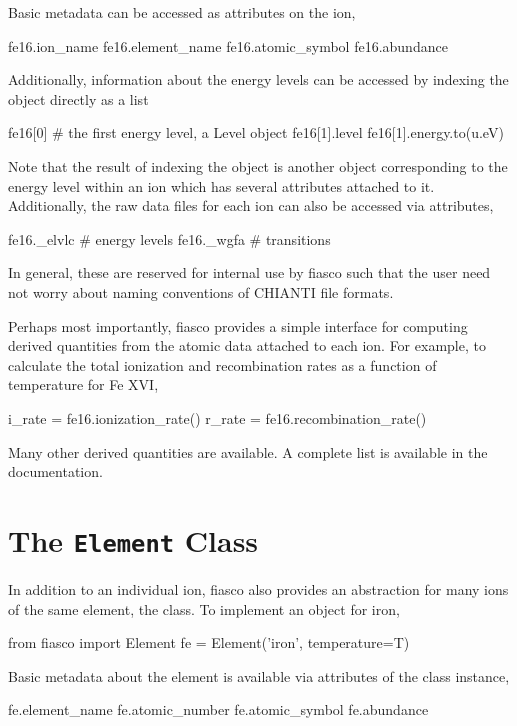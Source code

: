 Basic metadata can be accessed as attributes on the ion,
\begin{pyverbatim}[appendix1][baselinestretch=1,xleftmargin=3em]
fe16.ion_name
fe16.element_name
fe16.atomic_symbol
fe16.abundance
\end{pyverbatim}
Additionally, information about the energy levels can be accessed by indexing the object directly as a list
\begin{pyverbatim}[appendix1][baselinestretch=1,xleftmargin=3em]
fe16[0] # the first energy level, a Level object
fe16[1].level
fe16[1].energy.to(u.eV)
\end{pyverbatim}
Note that the result of indexing the  object is another object corresponding to the energy level within an ion which has several attributes attached to it. Additionally, the raw data files for each ion can also be accessed via attributes,
\begin{pyverbatim}[appendix1][baselinestretch=1,xleftmargin=3em]
fe16._elvlc # energy levels
fe16._wgfa # transitions 
\end{pyverbatim}
In general, these are reserved for internal use by fiasco such that the user need not worry about naming conventions of CHIANTI file formats.

Perhaps most importantly, fiasco provides a simple interface for computing derived quantities from the atomic data attached to each ion. For example, to calculate the total ionization and recombination rates as a function of temperature for Fe XVI,
\begin{pyverbatim}[appendix1][baselinestretch=1,xleftmargin=3em]
i_rate = fe16.ionization_rate()
r_rate = fe16.recombination_rate()
\end{pyverbatim}
Many other derived quantities are available. A complete list is available in the documentation.

\section{The \texttt{Element} Class}\label{sec:fiasco-element}

In addition to an individual ion, fiasco also provides an abstraction for many ions of the same element, the  class. To implement an  object for iron,
\begin{pyverbatim}[appendix1][baselinestretch=1,xleftmargin=3em]
from fiasco import Element
fe = Element('iron', temperature=T)
\end{pyverbatim}
Basic metadata about the element is available via attributes of the class instance,
\begin{pyverbatim}[appendix1][baselinestretch=1,xleftmargin=3em]
fe.element_name
fe.atomic_number
fe.atomic_symbol
fe.abundance
\end{pyverbatim}

